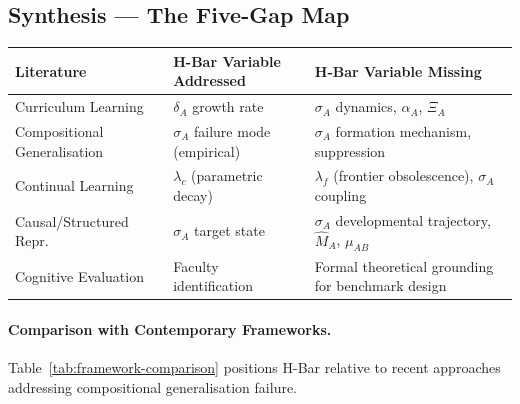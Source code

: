 \documentclass[11pt,a4paper]{article}
\begin{document}
\subsection{Synthesis --- The Five-Gap Map}\label{sec:five-gap-map}

\begin{center}
\begin{tabular}{>{\raggedright}p{3.5cm} >{\raggedright}p{3.5cm} >{\raggedright\arraybackslash}p{6.5cm}}
\toprule
\textbf{Literature} & \textbf{H-Bar Variable Addressed} & \textbf{H-Bar Variable Missing} \\
\midrule
Curriculum Learning & $\delta_A$ growth rate & $\sigma_A$ dynamics, $\alpha_A$, $\Xi_A$ \\
Compositional Generalisation & $\sigma_A$ failure mode (empirical) & $\sigma_A$ formation mechanism, suppression \\
Continual Learning & $\lambda_c$ (parametric decay) & $\lambda_f$ (frontier obsolescence), $\sigma_A$ coupling \\
Causal/Structured Repr. & $\sigma_A$ target state & $\sigma_A$ developmental trajectory, $\hat M_A$, $\mu_{AB}$ \\
Cognitive Evaluation & Faculty identification & Formal theoretical grounding for benchmark design \\
\bottomrule
\end{tabular}
\end{center}

\paragraph{Comparison with Contemporary Frameworks.}
Table~\ref{tab:framework-comparison} positions H-Bar relative to recent
approaches addressing compositional generalisation failure.
\end{document}
